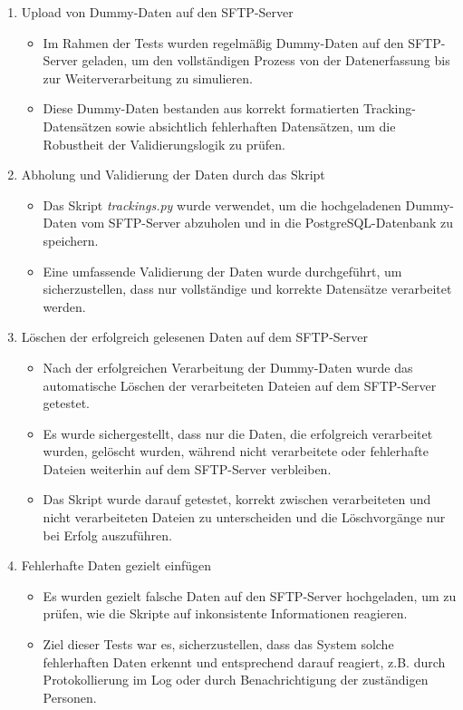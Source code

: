 \begin{enumerate}
    \item Upload von Dummy-Daten auf den SFTP-Server
    \begin{itemize}
        \item Im Rahmen der Tests wurden regelmäßig Dummy-Daten auf den SFTP-Server geladen, um den vollständigen Prozess von der Datenerfassung bis zur Weiterverarbeitung zu simulieren.
        \item Diese Dummy-Daten bestanden aus korrekt formatierten Tracking-Datensätzen sowie absichtlich fehlerhaften Datensätzen, um die Robustheit der Validierungslogik zu prüfen.
    \end{itemize}
    \item Abholung und Validierung der Daten durch das Skript
    \begin{itemize}
        \item Das Skript \textit{trackings.py} wurde verwendet, um die hochgeladenen Dummy-Daten vom SFTP-Server abzuholen und in die PostgreSQL-Datenbank zu speichern.
        \item Eine umfassende Validierung der Daten wurde durchgeführt, um sicherzustellen, dass nur vollständige und korrekte Datensätze verarbeitet werden.
    \end{itemize}
    \item Löschen der erfolgreich gelesenen Daten auf dem SFTP-Server
    \begin{itemize}
        \item Nach der erfolgreichen Verarbeitung der Dummy-Daten wurde das automatische Löschen der verarbeiteten Dateien auf dem SFTP-Server getestet.
        \item Es wurde sichergestellt, dass nur die Daten, die erfolgreich verarbeitet wurden, gelöscht wurden, während nicht verarbeitete oder fehlerhafte Dateien weiterhin auf dem SFTP-Server verbleiben.
        \item Das Skript wurde darauf getestet, korrekt zwischen verarbeiteten und nicht verarbeiteten Dateien zu unterscheiden und die Löschvorgänge nur bei Erfolg auszuführen.
    \end{itemize}
    \item Fehlerhafte Daten gezielt einfügen
    \begin{itemize}
        \item Es wurden gezielt falsche Daten auf den SFTP-Server hochgeladen, um zu prüfen, wie die Skripte auf inkonsistente Informationen reagieren.
        \item Ziel dieser Tests war es, sicherzustellen, dass das System solche fehlerhaften Daten erkennt und entsprechend darauf reagiert, z.B. durch Protokollierung im Log oder durch Benachrichtigung der zuständigen Personen.

\end{itemize}
\end{enumerate}
